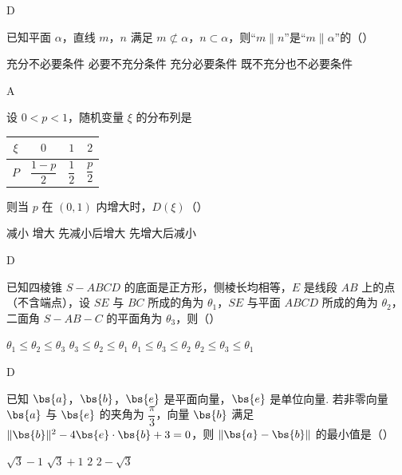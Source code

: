 \begin{answer}
D
\end{answer}

\begin{problem}
已知平面 \(\alpha\)，直线 \(m\)，\(n\) 满足 \(m\not\subset\alpha\)，\(n\subset\alpha\)，则“\(m\parallel n\)”是“\(m\parallel\alpha\)”的（\quad）

\choices
    {充分不必要条件}
    {必要不充分条件}
    {充分必要条件}
    {既不充分也不必要条件}
\end{problem}

\begin{answer}
A
\end{answer}

\begin{problem}
设 \(0<p<1\)，随机变量 \(\xi\) 的分布列是

\begin{center}
\begin{tabular}{c|ccc}
\(\xi\) & \(0\) & \(1\) & \(2\) \\
\hline
\(P\) & \(\dfrac{1-p}{2}\) & \(\dfrac12\) & \(\dfrac p2\)
\end{tabular}
\end{center}

则当 \(p\) 在 \((0,1)\) 内增大时，\(D(\xi)\)（\quad）

\choices
    {减小}
    {增大}
    {先减小后增大}
    {先增大后减小}
\end{problem}

\begin{answer}
D
\end{answer}

\begin{problem}
已知四棱锥 \(S-ABCD\) 的底面是正方形，侧棱长均相等，\(E\) 是线段 \(AB\) 上的点（不含端点），设 \(SE\) 与 \(BC\) 所成的角为 \(\theta_1\)，\(SE\) 与平面 \(ABCD\) 所成的角为 \(\theta_2\)，二面角 \(S-AB-C\) 的平面角为 \(\theta_3\)，则（\quad）

\choices
    {\(\theta_1\le\theta_2\le\theta_3\)}
    {\(\theta_3\le\theta_2\le\theta_1\)}
    {\(\theta_1\le\theta_3\le\theta_2\)}
    {\(\theta_2\le\theta_3\le\theta_1\)}
\end{problem}

\begin{answer}
D
\end{answer}

\begin{problem}
已知 \(\bs{a}\)，\(\bs{b}\)，\(\bs{e}\) 是平面向量，\(\bs{e}\) 是单位向量. 若非零向量 \(\bs{a}\) 与 \(\bs{e}\) 的夹角为 \(\dfrac{\pi}{3}\)，向量 \(\bs{b}\) 满足 \(\lVert\bs{b}\rVert^2-4\bs{e}\cdot\bs{b}+3=0\)，则 \(\lVert\bs{a}-\bs{b}\rVert\) 的最小值是（\quad）

\choices
    {\(\sqrt3-1\)}
    {\(\sqrt3+1\)}
    {\(2\)}
    {\(2-\sqrt3\)}
\end{problem}

